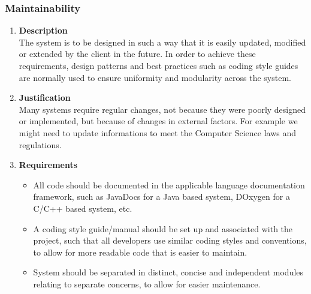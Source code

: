 \documentclass[a4paper,10pt]{article}
\begin{document}
\subsubsection{Maintainability}
\begin{enumerate}
\item \textbf{Description} \\
The system is to be designed in such a way that it is easily updated, modified or extended by the client in the future. In order to achieve these requirements, design patterns and best practices such as coding style guides are normally used to ensure uniformity and modularity across the system.
\item \textbf{Justification} \\
Many systems require regular changes, not because they were poorly designed or implemented, but because of changes in external factors. For example we might need to update informations to meet the Computer Science laws and regulations.
\item \textbf{Requirements}
	\begin{itemize}
		\item All code should be documented in the applicable language documentation framework, such as JavaDocs for a Java based system, DOxygen for a C/C++ based system, etc.
		\item A coding style guide/manual should be set up and associated with the project, such that all developers use similar coding styles and conventions, to allow for more readable code that is easier to maintain.
		\item System should be separated in distinct, concise and independent modules relating to separate concerns, to allow for easier maintenance.
	\end{itemize}
\end{enumerate}
\end{document}
